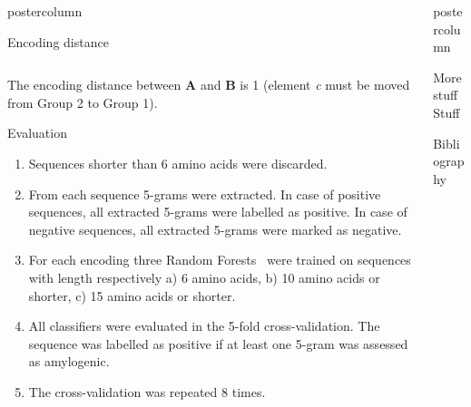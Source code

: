 \documentclass[final]{beamer}\usepackage[]{graphicx}\usepackage[]{color}
\newlength{\columnheight}
\begin{document}
\begin{frame}
\begin{columns}
\begin{column}{.49\textwidth}
\begin{beamercolorbox}[center,wd=\textwidth]{postercolumn}
\begin{minipage}[T]{.95\textwidth}
{\begin{block}{Encoding distance}
\begin{columns}
\end{columns}

The encoding distance between \textbf{A} and \textbf{B} is 1 (element \textit{c} must be moved from Group 2 to Group 1).

\end{block}
\vfill

\begin{block}{Evaluation}

\begin{enumerate}[1.]
\item Sequences shorter than 6 amino acids were discarded.
\item From each sequence 5-grams were extracted. In case of positive sequences, all extracted 5-grams were labelled as positive. In case of negative sequences, all extracted 5-grams were marked as negative.
\item For each encoding three Random Forests~\citep{liaw_classification_2002} were trained on sequences with length respectively a) 6 amino acids, b) 10 amino acids or shorter, c) 15 amino acids or shorter.
\item All classifiers were evaluated in the 5-fold cross-validation. The sequence was labelled as positive if at least one 5-gram was assessed as amylogenic.
\item The cross-validation was repeated 8 times.
\end{enumerate}

\end{block}
\vfill


}
\end{minipage}
\end{beamercolorbox}
\end{column}



\begin{column}{.49\textwidth}
\begin{beamercolorbox}[center,wd=\textwidth]{postercolumn}
\begin{minipage}[T]{.95\textwidth}  
\parbox[t][\columnheight]{\textwidth}
{




\begin{block}{More stuff}
Stuff
\end{block}
\vfill

\begin{block}{Bibliography}
  \tiny{
  
  
  }
  \end{block}
  \vfill

}
\end{minipage}
\end{beamercolorbox}
\end{column}
\end{columns}  
\end{frame}
\end{document}
